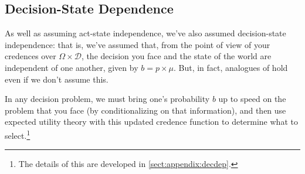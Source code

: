 \documentclass[a4paper,final]{article}
\newcommand\EU{\mathrm{EU}}
\newcommand{\D}{\mathcal{D}}
\renewcommand\S{\mathcal{S}}
\newenvironment{CCM rewritten}
{\begingroup\color{blue}} %
{\endgroup}              %
\begin{document}


\subsection{Decision-State Dependence}\label{sect:decdep}

As well as assuming act-state independence, we've also assumed decision-state independence: that is, we've assumed that, from the point of view of your credences over $\Omega \times \D$, the decision you face and the state of the world are independent of one another, given by $b=p\times\mu$. But, in fact, analogues of  hold even if we don't assume this. 

In any decision problem, we must bring one's probability $b$ up to speed on the problem that you face (by conditionalizing on that information), and then use expected utility theory with this updated credence function to determine what to select.\footnote{The details of this are developed in \cref{sect:appendix:decdep}.}
\end{document}
